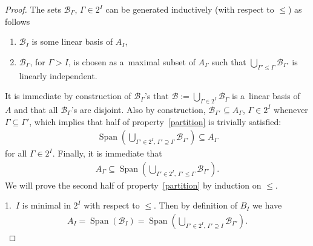 \documentclass[11pt]{article}
\DeclareMathOperator{\Span}{Span}
\begin{document}
\begin{proof}
The sets $\mathcal{B}_\Gamma$, $\Gamma\in2^I$ can be generated inductively (with respect to $\leq$) as follows
\begin{enumerate}\itemsep=0pt
\item[1)] $\mathcal{B}_I$ is some linear basis of $A_I$,
\item[2)] $\mathcal{B}_\Gamma$, for $\Gamma>I$, is chosen as a~maximal subset of $A_\Gamma$ such that
$\bigcup_{\Gamma'\leq\Gamma}\mathcal{B}_{\Gamma'}$ is linearly independent.
\end{enumerate}
It is immediate by construction of $\mathcal{B}_\Gamma$'s that $\mathcal{B}:=\bigcup_{\Gamma\in2^I}\mathcal{B}_\Gamma$
is a~linear basis of~$A$ and that all $\mathcal{B}_\Gamma$'s are disjoint.
Also by construction, $\mathcal{B}_{\Gamma'}\subseteq A_\Gamma$, $\Gamma\in2^I$ whenever $\Gamma\subseteq \Gamma'$,
which implies that half of property~\eqref{partition} is trivially satisf\/ied:
\begin{gather*}
\Span\left(\bigcup_{\Gamma'\in2^I,\, \Gamma'\supseteq\Gamma}\mathcal{B}_{\Gamma'}\right)\subseteq A_\Gamma
\end{gather*}
for all $\Gamma\in2^I$.
Finally, it is immediate that
\begin{gather}
\label{partition0}
A_\Gamma\subseteq\Span\left(\bigcup_{\Gamma'\in2^I,\, \Gamma'\leq\Gamma}\mathcal{B}_{\Gamma'}\right).
\end{gather}
We will prove the second half of property~\eqref{partition} by induction on $\leq$.

1.~$I$ is minimal in $2^I$ with respect to $\leq$.
Then by def\/inition of $B_I$ we have
\begin{gather*}
A_I= \Span(\mathcal{B}_I) = \Span\left(\bigcup_{\Gamma'\in2^I,\, \Gamma'\supseteq I}\mathcal{B}_{\Gamma'}\right).
\end{gather*}


\end{proof}
\end{document}
